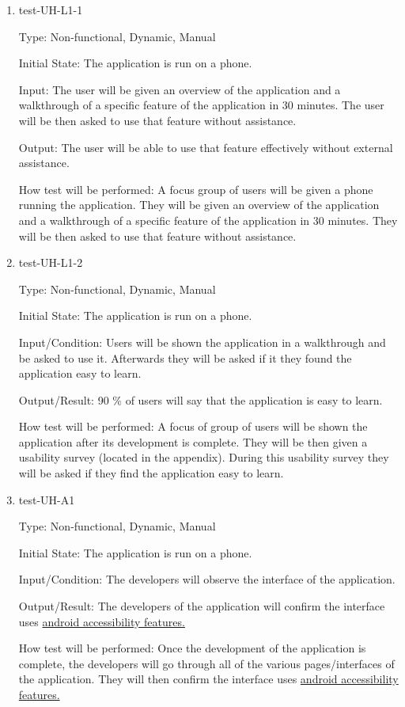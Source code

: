 \documentclass[12pt, titlepage]{article}
\begin{document}
\begin{enumerate}
\item{test-UH-L1-1\\}

Type: Non-functional, Dynamic, Manual
					
Initial State: The application is run on a phone.
					
Input: The user will be given an overview of the application and a walkthrough of a specific feature of the application in 30 minutes. The user will be then asked to use that feature without assistance.
					
Output: The user will be able to use that feature effectively without external assistance.
					
How test will be performed: A focus group of users will be given a phone running the application. They will be given an overview of the application and a walkthrough of a specific feature of the application in 30 minutes. They will be then asked to use that feature without assistance.

\item{test-UH-L1-2\\}

Type: Non-functional, Dynamic, Manual 
					
Initial State: The application is run on a phone.
					
Input/Condition: Users will be shown the application in a walkthrough and be asked to use it. Afterwards they will be asked if it they found the application easy to learn. 
					
Output/Result: 90 \% of users will say that the application is easy to learn. 
					
How test will be performed: A focus of group of users will be shown the application after its development is complete. They will be then given a usability survey (located in the appendix). During this usability survey they will be asked if they find the application easy to learn.


\item{test-UH-A1\\}

Type: Non-functional, Dynamic, Manual 
					
Initial State: The application is run on a phone.
					
Input/Condition: The developers will observe the interface of the application. 
					
Output/Result: The developers of the application will confirm the interface uses \href{https://support.google.com/accessibility/android/answer/6006564?hl=en}{android accessibility features.}
					
How test will be performed: Once the development of the application is complete, the developers will go through all of the various pages/interfaces of the application. They will then confirm the interface uses \href{https://support.google.com/accessibility/android/answer/6006564?hl=en}{android accessibility features.}
					

\end{enumerate}
\end{document}
